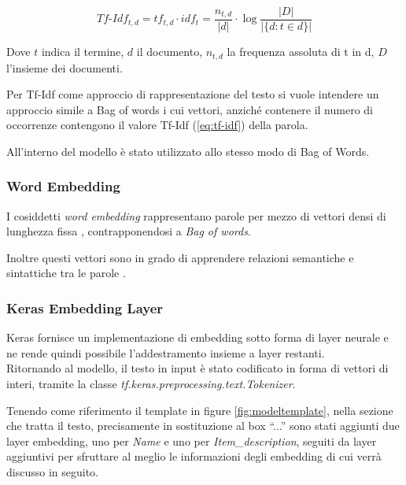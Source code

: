 \begin{equation}
	\label{eq:tf-idf}
	Tf\mbox{-}Idf_{t,d}
	=
	tf_{t,d} \cdot idf_t
	=
	\frac{n_{t,d}}{|d|} \cdot \log \frac{|D|}{|\{d: t \in d\}|}
\end{equation}

Dove $t$ indica il termine, $d$ il documento, $n_{t,d}$ la frequenza assoluta di
t in d, $D$ l'insieme dei documenti.

Per Tf-Idf come approccio di rappresentazione del testo si vuole intendere un
approccio simile a Bag of words i cui vettori, anziché contenere il
numero di occorrenze contengono il valore Tf-Idf (\ref{eq:tf-idf}) della parola.

All'interno del modello è stato utilizzato allo stesso modo di Bag
of Words.

\subsubsection{Word Embedding}

I cosiddetti \textit{word embedding} rappresentano parole per mezzo di vettori
densi di lunghezza fissa \cite{almeida2019word}, contrapponendosi a  \textit{Bag
	of words}.

Inoltre questi vettori sono in grado di apprendere relazioni semantiche e
sintattiche tra le parole \cite{mikolov2013efficient}.

\subsubsection{Keras Embedding Layer}

Keras fornisce un implementazione di embedding sotto forma di layer neurale e
ne rende quindi possibile l'addestramento insieme a layer restanti.
\\
Ritornando al modello, il testo in input è stato codificato in forma di
vettori di interi, tramite la classe \textit{tf.keras.preprocessing.\-text.Tokenizer}.

Tenendo come riferimento il template in figure
\ref{fig:modeltemplate}, nella sezione che tratta il testo, precisamente in
sostituzione al box ``...'' sono stati aggiunti due layer embedding, uno per
\textit{Name} e uno per \textit{Item\_description}, seguiti da layer aggiuntivi
per sfruttare al meglio le informazioni degli embedding di cui verrà discusso in
seguito.

